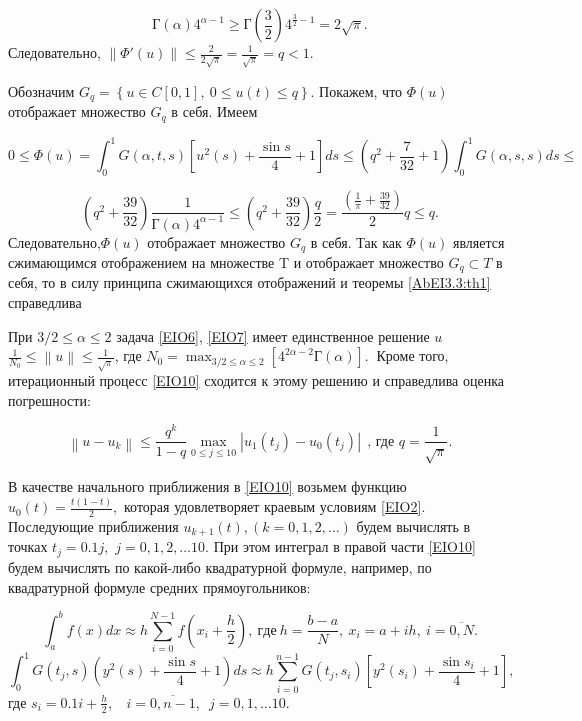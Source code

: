 $$Г\left(\alpha \right)4^{\alpha -1}\ge Г\left(\frac{3}{2}\right)4^{\frac{3}{2}-1}=2\sqrt{\pi }.$$
Следовательно, $\left\|{\Phi }'(u)\right\|\le \frac{2}{2\sqrt{\pi }}=\frac{1}{\sqrt{\pi }}=q<1.$

Обозначим $G_q=\left\{u\in C\left[0,1\right],\ 0\le u\left(t\right)\le q\right\}.$ Покажем, что $\Phi (u)$ отображает множество $G_q$ в себя.  Имеем

$$0 \le \Phi \left(u\right)=\int^1_0 G\left(\alpha ,t,s\right)\left[u^2\left(s\right)+\frac{\sin s}{4}+1\right]ds\le \left(q^2+\frac{7}{32}+1\right)\int^1_0{G\left(\alpha ,s,s\right)ds}\le$$


$$\left(q^2+\frac{39}{32}\right)\frac{1}{Г\left(\alpha \right)4^{\alpha -1}}\le \left(q^2+\frac{39}{32}\right)\frac{q}{2}=\frac{(\frac{1}{\pi }+\frac{39}{32})}{2}q\le q.$$
Следовательно,$\Phi \left(u\right)$ отображает множество  $G_{q}$ в себя.
Так как $\Phi (u)$ является сжимающимся отображением на множестве T и отображает множество $G_q\subset T$ в себя, то в силу принципа сжимающихся отображений и  теоремы \ref{AbEI3.3:th1} справедлива

\begin{theorem}\label{AbEI3.3:th2} При $3/2\le \alpha \le 2$ задача \eqref{EIO6}, \eqref{EIO7} имеет единственное решение $u$$\frac{1}{N_0}\le \left\|u\right\|\le \frac{1}{\sqrt{\pi }}$, где  $N_0={\mathop{max}_{3/2\le \alpha \le 2} \left[4^{2\alpha -2}Г\left(\alpha \right)\right].\ }$
Кроме того, итерационный процесс \eqref{EIO10} сходится к этому решению и справедлива оценка погрешности:

$$\left\|u-u_k\right\|\le \frac{q^k}{1-q}{\mathop{max}_{0\le j\le 10} \left|u_1\left(t_j\right)-u_0(t_j)\right|\ }\ \text{, где } q=\frac{1}{\sqrt{\pi }}.$$
\end{theorem}
В качестве начального приближения в \eqref{EIO10} возьмем функцию $u_0\left(t\right)=\frac{t\left(1-t\right)}{2},$ которая удовлетворяет краевым условиям \eqref{EIO2}. Последующие приближения $u_{k+1}\left(t\right),\left(k=0,1,2,\dots \right)$ будем вычислять в точках $t_j=0.1j,$ $j=0,1,2,\dots 10.$ При этом интеграл в правой части \eqref{EIO10} будем вычислять по какой-либо квадратурной формуле, например, по квадратурной формуле средних прямоугольников:

\begin{equation}
\label{EIO11}
\int^b_a{f\left(x\right)dx \approx h\sum^{N-1}_{i=0}{f\left(x_i+\frac{h}{2}\right),\ где\ h=\frac{b-a}{N},\ x_i=a+ih,\ i=\overline{0,N}.}}
\end{equation}
$$\int^1_0{G\left(t_j,s\right)\left(y^2\left(s\right)+\frac{\sin s}{4}+1\right)ds \approx h\sum^{n-1}_{i=0}{G}\left(t_j,s_i\right) [y^2(s_i)+\frac{\sin s_i}{4}+1]},$$
где $s_i=0.1i+\frac{h}{2},\ \ \ \ i=\overline{0,n-1}$,$\ \ \ j=0,1,\dots 10$.

